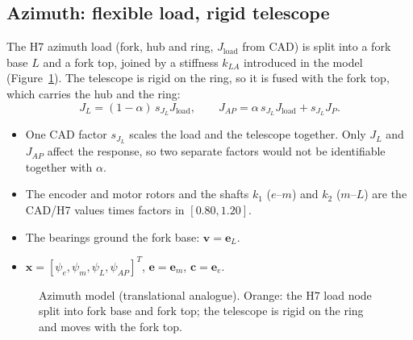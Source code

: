 \documentclass[10pt,a4paper]{article}
\numberwithin{equation}{section}
\newcommand{\ground}[3]{\draw[thick] (#1,#3) -- (#2,#3); \fill[pattern=north east lines] (#1,#3) rectangle (#2,#3-0.18);}
\begin{document}
\subsection{Azimuth: flexible load, rigid telescope}\label{sec:azmodel}
The H7 azimuth load (fork, hub and ring, $J_\mathrm{load}$ from CAD) is split into a fork base $L$ and a fork top, joined by a stiffness $k_{LA}$ introduced in the model (Figure~\ref{fig:az}). The telescope is rigid on the ring, so it is fused with the fork top, which carries the hub and the ring:
\begin{equation}
J_L=(1-\alpha)\,s_{J_L}J_\mathrm{load},\qquad J_{AP}=\alpha\,s_{J_L}J_\mathrm{load}+s_{J_L}J_P .
\end{equation}
\begin{itemize}
\item One CAD factor $s_{J_L}$ scales the load and the telescope together. Only $J_L$ and $J_{AP}$ affect the response, so two separate factors would not be identifiable together with $\alpha$.
\item The encoder and motor rotors and the shafts $k_1$ ($e$--$m$) and $k_2$ ($m$--$L$) are the CAD/H7 values times factors in $[0.80,1.20]$.
\item The bearings ground the fork base: $\mathbf v=\mathbf e_L$.
\item $\mathbf x=[\psi_e,\psi_m,\psi_L,\psi_{AP}]^T$, $\mathbf e=\mathbf e_m$, $\mathbf c=\mathbf e_e$.
\end{itemize}

\begin{figure}[H]\centering
{}
\caption{Azimuth model (translational analogue). Orange: the H7 load node split into fork base and fork top; the telescope is rigid on the ring and moves with the fork top.}\label{fig:az}
\end{figure}
\end{document}
